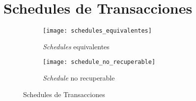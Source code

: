 \documentclass[a4paper, twoside]{article}
\begin{document}
\section{Schedules de Transacciones}
\begin{figure}[H]
	\centering
	\begin{subfigure}{0.66\textwidth}
		\centering
		\texttt{[image: schedules\_equivalentes]}
		\caption{\emph{Schedules} equivalentes}
	\end{subfigure}
	\begin{subfigure}{0.32\textwidth}
		\centering
		\texttt{[image: schedule\_no\_recuperable]}
		\caption{\emph{Schedule} no recuperable}
	\end{subfigure}
	\caption{Schedules de Transacciones}
\end{figure}
\end{document}

